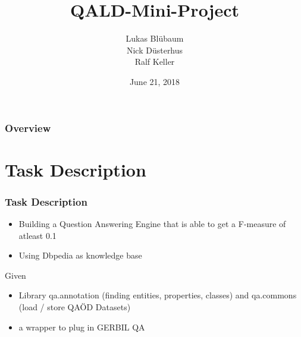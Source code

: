 \documentclass{beamer}
\title[QALD]{QALD-Mini-Project} %
\author[Data Science]{Lukas Bl{\"u}baum \\ Nick D{\"u}sterhus \\ Ralf Keller} %
\institute[UPB] %
{
University of Paderborn \\ %
\medskip
\textit{https://github.com/LukasBluebaum/QALD-Mini-Project} %
}
\date{June 21, 2018} %
\begin{document}
\begin{frame}
\titlepage %
\end{frame}

\begin{frame}
\frametitle{Overview} %
\tableofcontents %
\end{frame}


\section{Task Description} %

\begin{frame}
\frametitle{Task Description}
\begin{itemize}
	\item Building a Question Answering Engine that is able to get a F-measure of atleast 0.1 
	\item Using Dbpedia as knowledge base
\end{itemize}
\begin{block}{Given}
\begin{itemize}
	\item Library qa.annotation (finding entities, properties, classes) and qa.commons (load / store QAÖD Datasets)
	\item a wrapper to plug in GERBIL QA
\end{itemize}
\end{block}
\end{frame}
\end{document}
